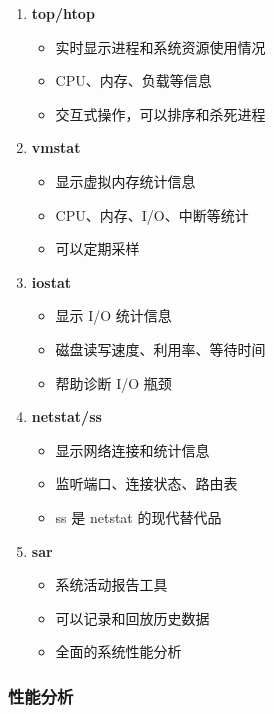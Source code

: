 \begin{enumerate}
  \item \textbf{top/htop}
    \begin{itemize}
      \item 实时显示进程和系统资源使用情况
      \item CPU、内存、负载等信息
      \item 交互式操作，可以排序和杀死进程
    \end{itemize}

  \item \textbf{vmstat}
    \begin{itemize}
      \item 显示虚拟内存统计信息
      \item CPU、内存、I/O、中断等统计
      \item 可以定期采样
    \end{itemize}

  \item \textbf{iostat}
    \begin{itemize}
      \item 显示 I/O 统计信息
      \item 磁盘读写速度、利用率、等待时间
      \item 帮助诊断 I/O 瓶颈
    \end{itemize}

  \item \textbf{netstat/ss}
    \begin{itemize}
      \item 显示网络连接和统计信息
      \item 监听端口、连接状态、路由表
      \item ss 是 netstat 的现代替代品
    \end{itemize}

  \item \textbf{sar}
    \begin{itemize}
      \item 系统活动报告工具
      \item 可以记录和回放历史数据
      \item 全面的系统性能分析
    \end{itemize}
\end{enumerate}

\subsubsection{性能分析}

